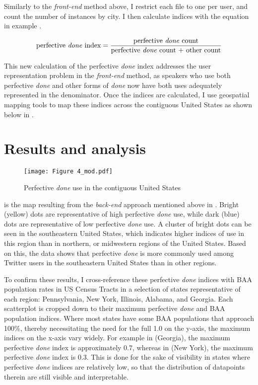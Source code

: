 \documentclass[output=paper,draftmode,colorlinks,citecolor=brown]{langscibook}
\begin{document}
Similarly to the \textit{front-end} method above, I restrict each file to one per user, and count the number of instances by city. I then calculate indices with the equation in example .

\ea \label{ex:baxter:19}
\[ 
\text{perfective \textit{done} index} = \frac{\text{perfective \textit{done} count}}{\text{perfective \textit{done} count + other count}}
\]
\z

This new calculation of the perfective \textit{done} index addresses the user representation problem in the \textit{front-end} method, as speakers who use both perfective \textit{done} and other forms of \textit{done} now have both uses adequately represented in the denominator. Once the indices are calculated, I use geospatial mapping tools to map these indices across the contiguous United States as shown below in .

\section{Results and analysis} %
\label{sec:baxter:5}

\begin{figure}
\texttt{[image: Figure 4\_mod.pdf]}
\caption{\label{fig:baxter:4} Perfective \textit{done} use in the contiguous United States}
\end{figure}

 is the map resulting from the \textit{back-end} approach mentioned above in . Bright (yellow) dots are representative of high perfective \textit{done} use, while dark (blue) dots are representative of low perfective \textit{done} use. A cluster of bright dots can be seen in the southeastern United States, which indicates higher indices of use in this region than in northern, or midwestern regions of the United States. Based on this, the data shows that perfective \textit{done} is more commonly used among Twitter users in the southeastern United States than in other regions.


To confirm these results, I cross-reference these perfective \textit{done} indices with BAA population rates in US Census Tracts in a selection of states representative of each region: Pennsylvania, New York, Illinois, Alabama, and Georgia. Each scatterplot is cropped down to their maximum perfective \textit{done} and BAA population indices. Where most states have some BAA populations that approach 100\%, thereby necessitating the need for the full 1.0 on the y-axis, the maximum indices on the x-axis vary widely. For example in  (Georgia), the maximum perfective \textit{done} index is approximately 0.7, whereas in  (New York), the maximum perfective \textit{done} index is 0.3. This is done for the sake of visibility in states where perfective \textit{done} indices are relatively low, so that the distribution of datapoints therein are still visible and interpretable.
\end{document}
